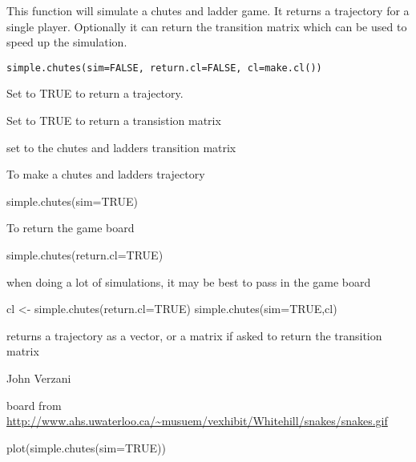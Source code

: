 \begin{Description}\relax
This function will simulate a chutes and ladder game. It 
returns a trajectory for a single player. Optionally it can return the 
transition matrix which can be used to speed up the simulation.
\end{Description}
\begin{Usage}
\begin{verbatim}
simple.chutes(sim=FALSE, return.cl=FALSE, cl=make.cl())
\end{verbatim}
\end{Usage}
\begin{Arguments}
\begin{ldescription}
\item[\code{sim}] Set to TRUE to return a trajectory.
\item[\code{return.cl}] Set to TRUE to return a transistion matrix 
\item[\code{cl}] set to the chutes and ladders transition matrix 
\end{ldescription}
\end{Arguments}
\begin{Details}\relax
To make a chutes and ladders trajectory

simple.chutes(sim=TRUE)

To return the game board

simple.chutes(return.cl=TRUE)

when doing a lot of simulations, it may be best to pass in the game
board

cl <- simple.chutes(return.cl=TRUE)
simple.chutes(sim=TRUE,cl)
\end{Details}
\begin{Value}
returns a trajectory as a vector, or a matrix if asked to return the
transition matrix
\end{Value}
\begin{Author}\relax
John Verzani
\end{Author}
\begin{References}\relax
board from \url{http://www.ahs.uwaterloo.ca/~musuem/vexhibit/Whitehill/snakes/snakes.gif}
\end{References}
\begin{Examples}
\begin{ExampleCode}
plot(simple.chutes(sim=TRUE))
\end{ExampleCode}
\end{Examples}

